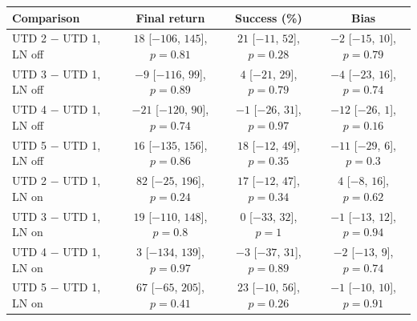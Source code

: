 \begin{tabular}{@{}lccc@{}}
\toprule
Comparison & Final return & Success (\%) & Bias \\
\midrule
UTD 2 $-$ UTD 1, LN off & $18$ {\scriptsize[$-106$, $145$]}, $p=0.81$ & $21$ {\scriptsize[$-11$, $52$]}, $p=0.28$ & $-2$ {\scriptsize[$-15$, $10$]}, $p=0.79$ \\
UTD 3 $-$ UTD 1, LN off & $-9$ {\scriptsize[$-116$, $99$]}, $p=0.89$ & $4$ {\scriptsize[$-21$, $29$]}, $p=0.79$ & $-4$ {\scriptsize[$-23$, $16$]}, $p=0.74$ \\
UTD 4 $-$ UTD 1, LN off & $-21$ {\scriptsize[$-120$, $90$]}, $p=0.74$ & $-1$ {\scriptsize[$-26$, $31$]}, $p=0.97$ & $-12$ {\scriptsize[$-26$, $1$]}, $p=0.16$ \\
UTD 5 $-$ UTD 1, LN off & $16$ {\scriptsize[$-135$, $156$]}, $p=0.86$ & $18$ {\scriptsize[$-12$, $49$]}, $p=0.35$ & $-11$ {\scriptsize[$-29$, $6$]}, $p=0.3$ \\
UTD 2 $-$ UTD 1, LN on & $82$ {\scriptsize[$-25$, $196$]}, $p=0.24$ & $17$ {\scriptsize[$-12$, $47$]}, $p=0.34$ & $4$ {\scriptsize[$-8$, $16$]}, $p=0.62$ \\
UTD 3 $-$ UTD 1, LN on & $19$ {\scriptsize[$-110$, $148$]}, $p=0.8$ & $0$ {\scriptsize[$-33$, $32$]}, $p=1$ & $-1$ {\scriptsize[$-13$, $12$]}, $p=0.94$ \\
UTD 4 $-$ UTD 1, LN on & $3$ {\scriptsize[$-134$, $139$]}, $p=0.97$ & $-3$ {\scriptsize[$-37$, $31$]}, $p=0.89$ & $-2$ {\scriptsize[$-13$, $9$]}, $p=0.74$ \\
UTD 5 $-$ UTD 1, LN on & $67$ {\scriptsize[$-65$, $205$]}, $p=0.41$ & $23$ {\scriptsize[$-10$, $56$]}, $p=0.26$ & $-1$ {\scriptsize[$-10$, $10$]}, $p=0.91$ \\
\bottomrule
\end{tabular}
